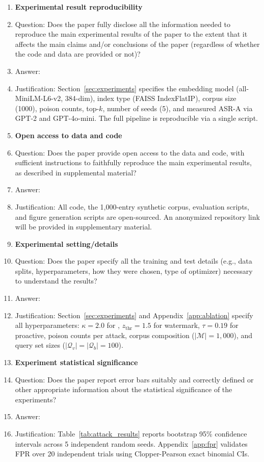 \begin{enumerate}
    \item {\bf Experimental result reproducibility}
    \item[] Question: Does the paper fully disclose all the information needed to reproduce the main experimental results of the paper to the extent that it affects the main claims and/or conclusions of the paper (regardless of whether the code and data are provided or not)?
    \item[] Answer: \answerYes{}
    \item[] Justification: Section~\ref{sec:experiments} specifies the embedding model (all-MiniLM-L6-v2, 384-dim), index type (FAISS IndexFlatIP), corpus size (1000), poison counts, top-$k$, number of seeds (5), and measured ASR-A via GPT-2 and GPT-4o-mini. The full pipeline is reproducible via a single script.

\item {\bf Open access to data and code}
    \item[] Question: Does the paper provide open access to the data and code, with sufficient instructions to faithfully reproduce the main experimental results, as described in supplemental material?
    \item[] Answer: \answerYes{}
    \item[] Justification: All code, the 1,000-entry synthetic corpus, evaluation scripts, and figure generation scripts are open-sourced. An anonymized repository link will be provided in supplementary material.

\item {\bf Experimental setting/details}
    \item[] Question: Does the paper specify all the training and test details (e.g., data splits, hyperparameters, how they were chosen, type of optimizer) necessary to understand the results?
    \item[] Answer: \answerYes{}
    \item[] Justification: Section~\ref{sec:experiments} and Appendix~\ref{app:ablation} specify all hyperparameters: $\kappa=2.0$ for \memsad{}, $z_{\mathrm{thr}}=1.5$ for watermark, $\tau=0.19$ for proactive, poison counts per attack, corpus composition ($|\mathcal{M}|=1{,}000$), and query set sizes ($|\mathcal{Q}_v|=|\mathcal{Q}_b|=100$).

\item {\bf Experiment statistical significance}
    \item[] Question: Does the paper report error bars suitably and correctly defined or other appropriate information about the statistical significance of the experiments?
    \item[] Answer: \answerYes{}
    \item[] Justification: Table~\ref{tab:attack_results} reports bootstrap 95\% confidence intervals across 5 independent random seeds. Appendix~\ref{app:fpr} validates FPR over 20 independent trials using Clopper-Pearson exact binomial CIs.


\end{enumerate}
